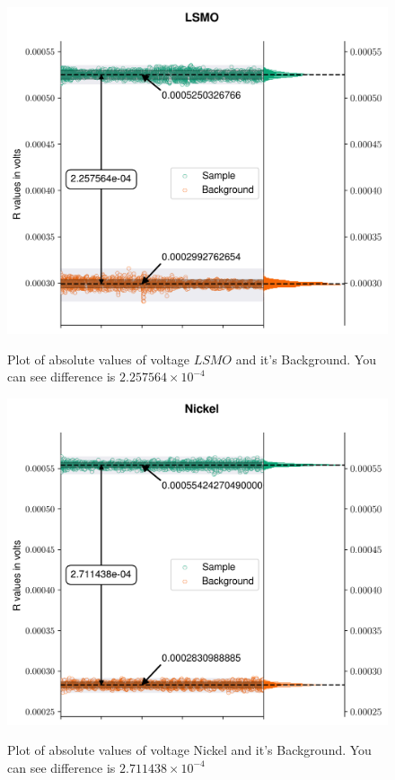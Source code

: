 \begin{figure}[hbt!]
  \includegraphics[width= \linewidth]{plots/LSMOR.png}
    \label{Rdata3}
  \caption{Plot of absolute values of voltage $LSMO$ and it's Background. You can see difference is $2.257564 \times 10^{-4}$}
\end{figure}
\begin{figure}[hbt!]
  \includegraphics[width= \linewidth]{plots/nickelR.png}
    \label{Rdata4}
  \caption{Plot of absolute values of voltage Nickel and it's Background. You can see difference is $2.711438 \times 10^{-4}$}
\end{figure}

